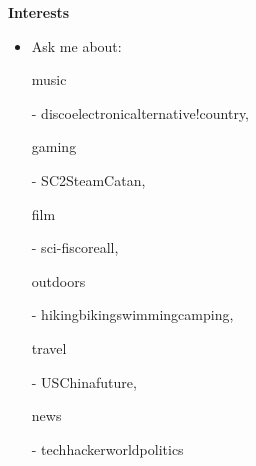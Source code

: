 \documentclass[11pt]{article}
\begin{document}
\vspace{-0.3em}

\begin{LARGE}
	\bf Interests
\end{LARGE}

\vspace{-0.5em}

\begin{itemize}
	\item Ask me about: \begin{bf}music\end{bf} - disco\textbar electronic\textbar alternative\textbar !country, \begin{bf}gaming\end{bf} - SC2\textbar Steam\textbar Catan, \begin{bf}film\end{bf} - sci-fi\textbar score\textbar all, \begin{bf}outdoors\end{bf} - hiking\textbar biking\textbar swimming\textbar camping, \begin{bf}travel\end{bf} - US\textbar China\textbar future, \begin{bf}news\end{bf} - tech\textbar hacker\textbar world\textbar politics
\end{itemize}
\end{document}
